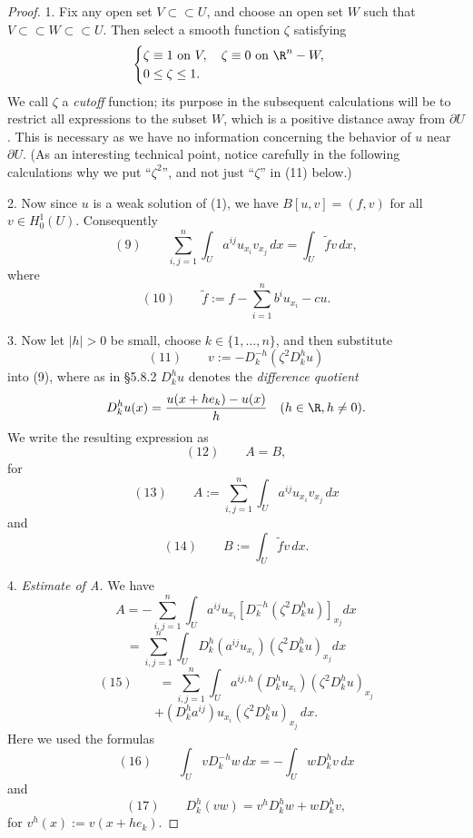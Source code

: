 \begin{proof}
1. Fix any open set $V \subset\subset U$, and choose an open set $W$ such that $V \subset\subset W \subset\subset U$. Then select a smooth function $\zeta$ satisfying
$$\begin{cases} \zeta \equiv 1 \text{ on } V, \quad \zeta \equiv 0 \text{ on } \R^n - W, \\ 0 \leq \zeta \leq 1. \end{cases}$$
We call $\zeta$ a \textit{cutoff} function; its purpose in the subsequent calculations will be to restrict all expressions to the subset $W$, which is a positive distance away from $\partial U$. This is necessary as we have no information concerning the behavior of $u$ near $\partial U$. (As an interesting technical point, notice carefully in the following calculations why we put ``$\zeta^2$'', and not just ``$\zeta$'' in (11) below.)

2. Now since $u$ is a weak solution of (1), we have $B[u,v] = (f,v)$ for all $v \in H_0^1(U)$. Consequently
$$(9) \qquad \sum_{i,j=1}^n \int_U a^{ij}u_{x_i}v_{x_j}\,dx = \int_U \tilde f v\,dx,$$
where
$$(10) \qquad \tilde f := f - \sum_{i=1}^n b^iu_{x_i} - cu.$$

3. Now let $|h| > 0$ be small, choose $k \in \{1,\ldots,n\}$, and then substitute
$$(11) \qquad v := -D_k^{-h}(\zeta^2D_k^hu)$$
into (9), where as in \S5.8.2 $D_k^hu$ denotes the \textit{difference quotient}
$$D_k^hu(x) = \frac{u(x+he_k)-u(x)}h \quad (h \in \R, h \neq 0).$$
We write the resulting expression as
$$(12) \qquad A = B,$$
for
$$(13) \qquad A := \sum_{i,j=1}^n \int_U a^{ij}u_{x_i}v_{x_j}\,dx$$
and
$$(14) \qquad B := \int_U \tilde f v\,dx.$$

4. \textit{Estimate of A.} We have
$$A = -\sum_{i,j=1}^n \int_U a^{ij}u_{x_i}\left[D_k^{-h}(\zeta^2D_k^hu)\right]_{x_j}dx$$
$$= \sum_{i,j=1}^n \int_U D_k^h(a^{ij}u_{x_i})\left(\zeta^2D_k^hu\right)_{x_j}dx$$
$$(15) \qquad = \sum_{i,j=1}^n \int_U a^{ij,h}(D_k^hu_{x_i})(\zeta^2D_k^hu)_{x_j}$$
$$+ (D_k^ha^{ij})u_{x_i}(\zeta^2D_k^hu)_{x_j}\,dx.$$
Here we used the formulas
$$(16) \qquad \int_U vD_k^{-h}w\,dx = -\int_U wD_k^hv\,dx$$
and
$$(17) \qquad D_k^h(vw) = v^hD_k^hw + wD_k^hv,$$
for $v^h(x) := v(x+he_k)$.


\end{proof}
